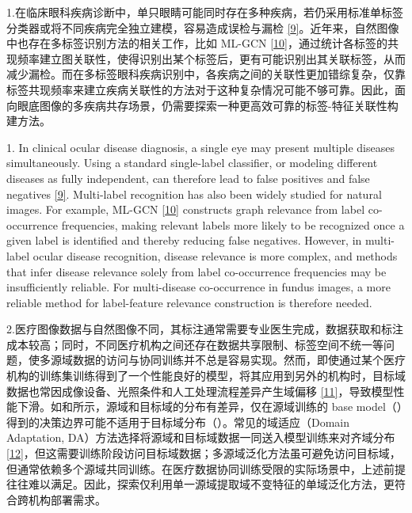 1.在临床眼科疾病诊断中，单只眼睛可能同时存在多种疾病，若仍采用标准单标签分类器或将不同疾病完全独立建模，容易造成误检与漏检 \hyperref[_Ref213949362]{{[}9{]}}。近年来，自然图像中也存在多标签识别方法的相关工作，比如 ML-GCN \hyperref[_Ref213949382]{{[}10{]}}，通过统计各标签的共现频率建立图关联性，使得识别出某个标签后，更有可能识别出其关联标签，从而减少漏检。而在多标签眼科疾病识别中，各疾病之间的关联性更加错综复杂，仅靠标签共现频率来建立疾病关联性的方法对于这种复杂情况可能不够可靠。因此，面向眼底图像的多疾病共存场景，仍需要探索一种更高效可靠的标签-特征关联性构建方法。

1. In clinical ocular disease diagnosis, a single eye may present multiple diseases simultaneously. Using a standard single-label classifier, or modeling different diseases as fully independent, can therefore lead to false positives and false negatives \hyperref[_Ref213949362]{{[}9{]}}. Multi-label recognition has also been widely studied for natural images. For example, ML-GCN \hyperref[_Ref213949382]{{[}10{]}} constructs graph relevance from label co-occurrence frequencies, making relevant labels more likely to be recognized once a given label is identified and thereby reducing false negatives. However, in multi-label ocular disease recognition, disease relevance is more complex, and methods that infer disease relevance solely from label co-occurrence frequencies may be insufficiently reliable. For multi-disease co-occurrence in fundus images, a more reliable method for label-feature relevance construction is therefore needed.

2.医疗图像数据与自然图像不同，其标注通常需要专业医生完成，数据获取和标注成本较高；同时，不同医疗机构之间还存在数据共享限制、标签空间不统一等问题，使多源域数据的访问与协同训练并不总是容易实现。然而，即使通过某个医疗机构的训练集训练得到了一个性能良好的模型，将其应用到另外的机构时，目标域数据也常因成像设备、光照条件和人工处理流程差异产生域偏移 \hyperref[_Ref213949348]{{[}11{]}}，导致模型性能下滑。如和所示，源域和目标域的分布有差异，仅在源域训练的 base model（）得到的决策边界可能不适用于目标域分布（）。常见的域适应（Domain Adaptation, DA）方法选择将源域和目标域数据一同送入模型训练来对齐域分布 \hyperref[_Ref213949354]{{[}12{]}}，但这需要训练阶段访问目标域数据；多源域泛化方法虽可避免访问目标域，但通常依赖多个源域共同训练。在医疗数据协同训练受限的实际场景中，上述前提往往难以满足。因此，探索仅利用单一源域提取域不变特征的单域泛化方法，更符合跨机构部署需求。

